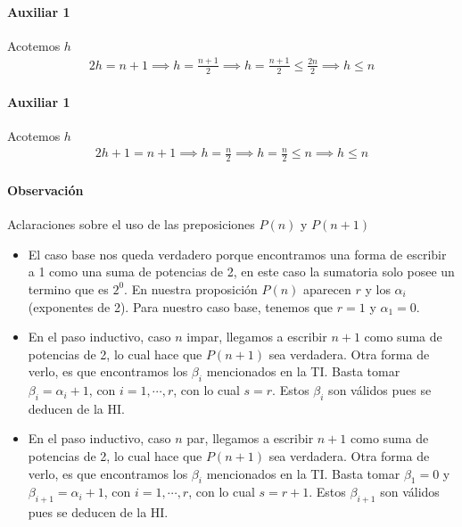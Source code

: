 \paragraph{Auxiliar 1}{
    Acotemos $h$
    \begin{align*}
        2h = n + 1 \implies h = \frac{n+1}{2} \implies h = \frac{n+1}{2} \leq \frac{2n}{2} \implies h \leq n
    \end{align*}
}
\paragraph{Auxiliar 1}{
    Acotemos $h$
    \begin{align*}
        2h + 1 = n + 1 \implies h = \frac{n}{2} \implies h = \frac{n}{2} \leq n \implies h \leq n
    \end{align*}
}

\paragraph{Observación}{
    Aclaraciones sobre el uso de las preposiciones $P(n)$ y $P(n+1)$
    \begin{itemize}
        \item El caso base nos queda verdadero porque encontramos una forma de escribir a 1 como una suma de potencias
        de 2, en este caso la sumatoria solo posee un termino que es $2^0$. En nuestra proposición $P(n)$ aparecen $r$ 
        y los $\alpha_i$ (exponentes de 2). Para nuestro caso base, tenemos que $r = 1$ y $\alpha_1 = 0$.
        \item En el paso inductivo, caso $n$ impar, llegamos a escribir $n+1$ como suma de potencias de 2, lo cual
        hace que $P(n+1)$ sea verdadera. Otra forma de verlo, es que encontramos los $\beta_i$ mencionados en la TI. 
        Basta tomar $\beta_i = \alpha_i + 1$, con $i = 1, \cdots , r$, con lo cual $s = r$. Estos $\beta_i$ son válidos
        pues se deducen de la HI. 
        \item En el paso inductivo, caso $n$ par, llegamos a escribir $n+1$ como suma de potencias de 2, lo cual
        hace que $P(n+1)$ sea verdadera. Otra forma de verlo, es que encontramos los $\beta_i$ mencionados en la TI. 
        Basta tomar $\beta_1 = 0$ y $\beta_{i+1} = \alpha_i + 1$, con $i = 1, \cdots , r$, con lo cual $s = r + 1$.
        Estos $\beta_{i+1}$ son válidos pues se deducen de la HI. 
    \end{itemize}
}


